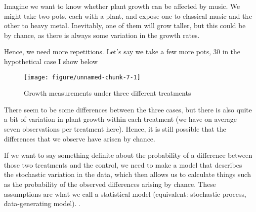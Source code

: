 \documentclass[a4paper,twoside]{tufte-book}\usepackage[]{graphicx}\usepackage[]{color}
\makeatletter
\def\maxwidth{ %
  \ifdim\Gin@nat@width>\linewidth
    \linewidth
  \else
    \Gin@nat@width
  \fi
}
\makeatother
\begin{document}

Imagine we want to know whether plant growth can be affected by music. We might take two pots, each with a plant, and expose one to classical music and the other to heavy metal. Inevitably, one of them will grow taller, but this could be by chance, as there is always some variation in the growth rates. 

Hence, we need more repetitions. Let's say we take a few more pots, 30 in the hypothetical case I show below

\begin{figure}[htbp]
\begin{center}
\begin{Schunk}

\texttt{[image: figure/unnamed-chunk-7-1]} \end{Schunk}
\caption{Growth measurements under three different treatments}
\label{fig: plant growth music}
\end{center}
\end{figure}

There seem to be some differences between the three cases, but there is also quite a bit of variation in plant growth within each treatment (we have on average seven observations per treatment here). Hence, it is still possible that the differences that we observe have arisen by chance. 

If we want to say something definite about the probability of a difference between those two treatments and the control, we need to make a model that describes the stochastic variation in the data, which then allows us to calculate things such as the probability of the observed differences arising by chance. These assumptions are what we call a statistical model (equivalent: stochastic process, data-generating model). . 
\end{document}
